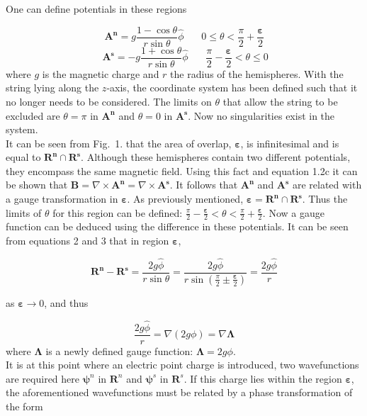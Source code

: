 \documentclass[twocolumn, 10pt]{article}
\begin{document}
\indent One can define potentials in these regions

\begin{equation} \tag{2}
\mathbf{A^n} = g\frac{1 - \cos\theta}{r\sin\theta}\hat\phi \ \ \ \ \ \ \ \ 0 \leq \theta < \frac{\pi}{2} + \frac{\bm{\varepsilon}}{2}
\end{equation}
\begin{equation}\
\mathbf{A^s} = -g\frac{1 + \cos\theta}{r\sin\theta}\hat\phi \ \ \ \ \ \ \ \ \frac{\pi}{2} - \frac{\bm{\varepsilon}}{2} < \theta \leq 0
\end{equation}
where $g$ is the magnetic charge and $r$ the radius of the hemispheres. With the string lying along the $z$-axis, the coordinate system has been defined such that it no longer needs to be considered. The limits on $\theta$ that allow the string to be excluded are $\theta = \pi$ in $\mathbf{A^n}$ and $\theta = 0$ in $\mathbf{A^s}$. Now no singularities exist in the system. \\
\indent It can be seen from Fig.~1. that the area of overlap, $\bm{\varepsilon}$, is infinitesimal and is equal to $\mathbf{R^n}\cap\mathbf{R^s}$. Although these hemispheres contain two different potentials,  they encompass the same magnetic field. Using this fact and equation 1.2c it can be shown that $\mathbf{B} = \nabla\times\mathbf{A^n} = \nabla\times\mathbf{A^s}$. It follows that $\mathbf{A^n}$ and $\mathbf{A^s}$ are related with a gauge transformation in $\bm{\varepsilon}$. As previously mentioned, $\bm{\varepsilon}=\mathbf{R^n}\cap\mathbf{R^s}$. Thus the limits of $\theta$ for this region can be defined: $\frac{\pi}{2} - \frac{\bm{\varepsilon}}{2} < \theta < \frac{\pi}{2} + \frac{\bm{\varepsilon}}{2}$. Now a gauge function can be deduced using the difference in these potentials. It can be seen from equations 2 and 3 that in region $\bm{\varepsilon}$, 

\begin{equation}
\mathbf{R^n}-\mathbf{R^s}=\frac{2g\hat\phi}{r\sin\theta}=\frac{2g\hat\phi}{r\sin(\frac{\pi}{2}\pm\frac{\bm{\varepsilon}}{2})}=\frac{2g\hat\phi}{r}
\end{equation}

as $\bm{\varepsilon}\longrightarrow0$, and thus

\begin{equation}
\frac{2g\hat\phi}{r} = \nabla(2g\phi) = \nabla\bm{\Lambda}
\end{equation}
where $\bm{\Lambda}$ is a newly defined gauge function: $\bm{\Lambda} = 2g\phi$.\\
\indent It is at this point where an electric point charge is introduced, two wavefunctions are required here $\bm{\psi}^n$ in $\bm{R}^n$ and $\bm{\psi}^s$ in $\bm{R}^s$. If this charge lies within the region $\bm{\varepsilon}$, the aforementioned wavefunctions must be related by a phase transformation of the form
\end{document}
